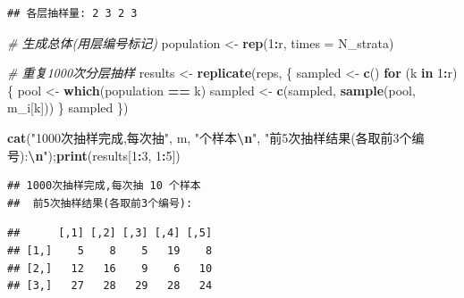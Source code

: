 \documentclass[
]{article}
\newenvironment{Shaded}{\begin{snugshade}}{\end{snugshade}}
\newcommand{\AttributeTok}[1]{\textcolor[rgb]{0.13,0.29,0.53}{#1}}
\newcommand{\CommentTok}[1]{\textcolor[rgb]{0.56,0.35,0.01}{\textit{#1}}}
\newcommand{\ControlFlowTok}[1]{\textcolor[rgb]{0.13,0.29,0.53}{\textbf{#1}}}
\newcommand{\DecValTok}[1]{\textcolor[rgb]{0.00,0.00,0.81}{#1}}
\newcommand{\FunctionTok}[1]{\textcolor[rgb]{0.13,0.29,0.53}{\textbf{#1}}}
\newcommand{\NormalTok}[1]{#1}
\newcommand{\OtherTok}[1]{\textcolor[rgb]{0.56,0.35,0.01}{#1}}
\newcommand{\SpecialCharTok}[1]{\textcolor[rgb]{0.81,0.36,0.00}{\textbf{#1}}}
\newcommand{\StringTok}[1]{\textcolor[rgb]{0.31,0.60,0.02}{#1}}
\begin{document}
\begin{verbatim}
## 各层抽样量: 2 3 2 3
\end{verbatim}

\begin{Shaded}
\begin{Highlighting}[]
\CommentTok{\# 生成总体(用层编号标记)}
\NormalTok{population }\OtherTok{\textless{}{-}} \FunctionTok{rep}\NormalTok{(}\DecValTok{1}\SpecialCharTok{:}\NormalTok{r, }\AttributeTok{times =}\NormalTok{ N\_strata)}

\CommentTok{\# 重复1000次分层抽样}
\NormalTok{results }\OtherTok{\textless{}{-}} \FunctionTok{replicate}\NormalTok{(reps, \{}
\NormalTok{  sampled }\OtherTok{\textless{}{-}} \FunctionTok{c}\NormalTok{()}
  \ControlFlowTok{for}\NormalTok{ (k }\ControlFlowTok{in} \DecValTok{1}\SpecialCharTok{:}\NormalTok{r) \{}
\NormalTok{    pool }\OtherTok{\textless{}{-}} \FunctionTok{which}\NormalTok{(population }\SpecialCharTok{==}\NormalTok{ k)}
\NormalTok{    sampled }\OtherTok{\textless{}{-}} \FunctionTok{c}\NormalTok{(sampled, }\FunctionTok{sample}\NormalTok{(pool, m\_i[k]))}
\NormalTok{  \}}
\NormalTok{  sampled}
\NormalTok{\})}

\FunctionTok{cat}\NormalTok{(}\StringTok{"1000次抽样完成,每次抽"}\NormalTok{, m, }\StringTok{"个样本}\SpecialCharTok{\textbackslash{}n}\StringTok{"}\NormalTok{,}
\StringTok{"前5次抽样结果(各取前3个编号):}\SpecialCharTok{\textbackslash{}n}\StringTok{"}\NormalTok{);}\FunctionTok{print}\NormalTok{(results[}\DecValTok{1}\SpecialCharTok{:}\DecValTok{3}\NormalTok{, }\DecValTok{1}\SpecialCharTok{:}\DecValTok{5}\NormalTok{])}
\end{Highlighting}
\end{Shaded}

\begin{verbatim}
## 1000次抽样完成,每次抽 10 个样本
##  前5次抽样结果(各取前3个编号):
\end{verbatim}

\begin{verbatim}
##      [,1] [,2] [,3] [,4] [,5]
## [1,]    5    8    5   19    8
## [2,]   12   16    9    6   10
## [3,]   27   28   29   28   24
\end{verbatim}
\end{document}
